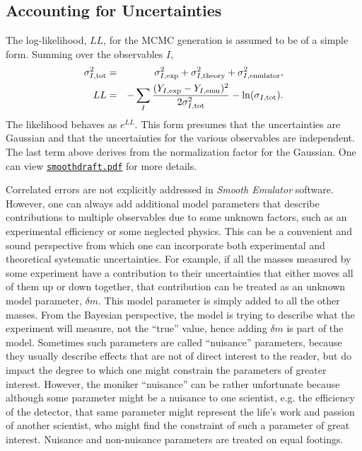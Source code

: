 \documentclass[UserManual.tex]{subfiles}
\begin{document}
\begin{sloppypar}
\subsection{Accounting for Uncertainties}

The log-likelihood, $LL$, for the MCMC generation is assumed to be of a simple form. Summing over the observables $I$,
\begin{eqnarray*}
\sigma_{I,{\rm tot}}^{2}&=&\sigma_{I,{\rm exp}}^2+\sigma_{I,{\rm theory}}^2+\sigma_{I,{\rm emulator}}^2,\\
LL&=&-\sum_{I}\frac{(Y_{I,{\rm exp}}-Y_{I,{\rm emu}})^{2}}{2\sigma_{I,{\rm tot}}^{2}}-\ln(\sigma_{I,{\rm tot}}).
\end{eqnarray*}
The likelihood behaves as $e^{LL}$. This form presumes that the uncertainties are Gaussian and that the uncertainties for the various observables are independent. The last term above derives from the normalization factor for the Gaussian. One can view \href{smoothdraft.pdf}{\tt smoothdraft.pdf} for more details.

Correlated errors are not explicitly addressed in {\it Smooth Emulator} software. However, one can always add additional model parameters that describe contributions to multiple observables due to some unknown factors, such as an experimental efficiency or some neglected physics. This can be a convenient and sound perspective from which one can incorporate both experimental and theoretical systematic uncertainties. For example, if all the masses measured by some experiment have a contribution to their uncertainties that either moves all of them up or down together, that contribution can be treated as an unknown model parameter, $\delta m$. This model parameter is simply added to all the other masses. From the Bayesian perspective, the model is trying to describe what the experiment will measure, not the ``true'' value, hence adding $\delta m$ is part of the model. Sometimes such parameters are called ``nuisance'' parameters, because they usually describe effects that are not of direct interest to the reader, but do impact the degree to which one might constrain the parameters of greater interest. However, the moniker ``nuisance'' can be rather unfortunate  because although some parameter might be a nuisance to one scientist, e.g. the efficiency of the detector, that same parameter might represent the life's work and passion of another scientist, who might find the constraint of such a parameter of great interest. Nuisance and non-nuisance parameters are treated on equal footings.


\end{sloppypar}
\end{document}
